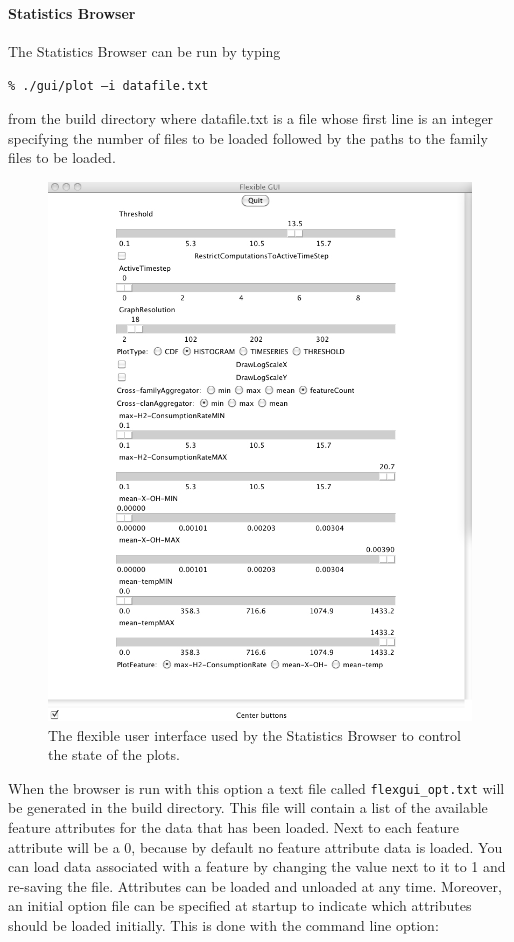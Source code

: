 \paragraph{Statistics Browser} 
The Statistics Browser can be run by typing 

\texttt{\% ./gui/plot --i datafile.txt}

from the build directory where datafile.txt is a file whose first line is an integer specifying the number of files
to be loaded followed by the paths to the family files to be loaded.

\begin{figure}[h]
  \center
  \includegraphics[width=5in]{jpeg/flexGUI.jpg} 
  \caption{The flexible user interface used by the Statistics Browser to control the state of the plots.}
  \label{fig:flexGUI}
\end{figure}

When the browser is run with this option a text file called \texttt{flexgui\_opt.txt} will be generated
in the build directory.  This file will contain a list of the available feature attributes for the data that has 
been loaded.  Next to each feature attribute will be a 0, because by default no feature attribute data is loaded.
You can load data associated with a feature by changing the value next to it to 1 and re-saving the file.
Attributes can be loaded and unloaded at any time.  Moreover, an initial option file can be specified at startup
to indicate which attributes should be loaded initially.  This is done with the command line option:

